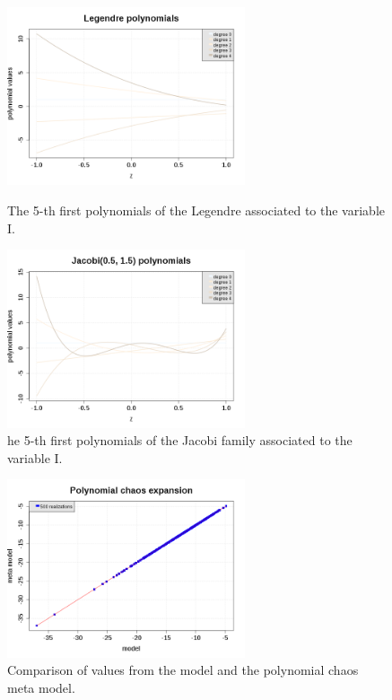              \begin{figure}[H]
               \begin{minipage}{9cm}
                 \begin{center}
                   \includegraphics[width=7cm]{Figures/PCE_LegendrePolynomials_VariableL.png}
                   \caption{The 5-th first polynomials of the Legendre associated to the variable I.}
                   \label{PCE_L}
                 \end{center}
               \end{minipage}
               \hfill
               \begin{minipage}{9cm}
                 \begin{center}
                   \includegraphics[width=7cm]{Figures/PCE_JacobiPolynomials_VariableI.png}
                   \caption{he 5-th first polynomials of the Jacobi family associated to the variable I.}
                   \label{PCE_I}
                 \end{center}
               \end{minipage}
             \end{figure}




             \begin{figure}[H]
               \begin{center}
                 \includegraphics[width=7cm]{Figures/PCE_comparisonModels.png}
                 \caption{Comparison of values from the model and the polynomial chaos meta model.}
                 \label{ModelsComparison}
               \end{center}
             \end{figure}


